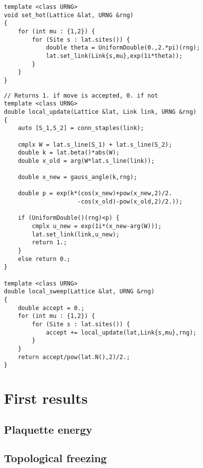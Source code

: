 \begin{lstlisting}[caption={Hot configuration}]
template <class URNG>
void set_hot(Lattice &lat, URNG &rng)
{
    for (int mu : {1,2}) {
        for (Site s : lat.sites()) {
            double theta = UniformDouble(0.,2.*pi)(rng);
            lat.set_link(Link{s,mu},exp(1i*theta));
        }
    }
}
\end{lstlisting}

\begin{lstlisting}[caption={Local algorithm}]
// Returns 1. if move is accepted, 0. if not
template <class URNG>
double local_update(Lattice &lat, Link link, URNG &rng)
{
    auto [S_1,S_2] = conn_staples(link);
    
    cmplx W = lat.s_line(S_1) + lat.s_line(S_2);
    double k = lat.beta()*abs(W);
    double x_old = arg(W*lat.s_line(link));
    
    double x_new = gauss_angle(k,rng);
    
    double p = exp(k*(cos(x_new)+pow(x_new,2)/2.
                     -cos(x_old)-pow(x_old,2)/2.));
    
    if (UniformDouble()(rng)<p) {
        cmplx u_new = exp(1i*(x_new-arg(W)));
        lat.set_link(link,u_new);
        return 1.;
    }
    else return 0.;
}

template <class URNG>
double local_sweep(Lattice &lat, URNG &rng)
{
    double accept = 0.;
    for (int mu : {1,2}) {
        for (Site s : lat.sites()) {
            accept += local_update(lat,Link{s,mu},rng);
        }
    }
    return accept/pow(lat.N(),2)/2.;
}
\end{lstlisting}

\section{First results}

\subsection{Plaquette energy}

\subsection{Topological freezing}

